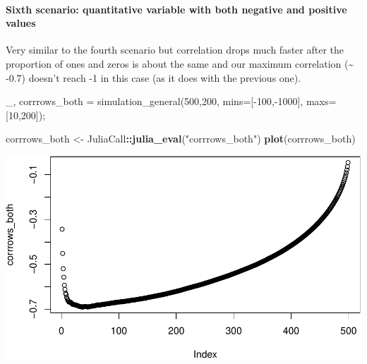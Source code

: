 \documentclass[]{article}
\newenvironment{Shaded}{\begin{snugshade}}{\end{snugshade}}
\newcommand{\FloatTok}[1]{\textcolor[rgb]{0.00,0.00,0.81}{#1}}
\newcommand{\KeywordTok}[1]{\textcolor[rgb]{0.13,0.29,0.53}{\textbf{#1}}}
\newcommand{\NormalTok}[1]{#1}
\newcommand{\OperatorTok}[1]{\textcolor[rgb]{0.81,0.36,0.00}{\textbf{#1}}}
\newcommand{\StringTok}[1]{\textcolor[rgb]{0.31,0.60,0.02}{#1}}
\let\oldparagraph\paragraph
\renewcommand{\paragraph}[1]{\oldparagraph{#1}\mbox{}}
\begin{document}
\newpage

\hypertarget{sixth-scenario-quantitative-variable-with-both-negative-and-positive-values}{%
\paragraph{Sixth scenario: quantitative variable with both negative and
positive
values}\label{sixth-scenario-quantitative-variable-with-both-negative-and-positive-values}}

Very similar to the fourth scenario but correlation drops much faster
after the proportion of ones and zeros is about the same and our maximum
correlation (\textasciitilde{} -0.7) doesn't reach -1 in this case (as
it does with the previous one).

\begin{Shaded}
\begin{Highlighting}[]
\NormalTok{_, corrrows_both = simulation_general(}\FloatTok{500}\NormalTok{,}\FloatTok{200}\NormalTok{, mins=[-}\FloatTok{100}\NormalTok{,-}\FloatTok{1000}\NormalTok{], maxs=[}\FloatTok{10}\NormalTok{,}\FloatTok{200}\NormalTok{]);}
\end{Highlighting}
\end{Shaded}

\begin{Shaded}
\begin{Highlighting}[]
\NormalTok{corrrows_both <-}\StringTok{ }\NormalTok{JuliaCall}\OperatorTok{::}\KeywordTok{julia_eval}\NormalTok{(}\StringTok{"corrrows_both"}\NormalTok{)}
\KeywordTok{plot}\NormalTok{(corrrows_both)}
\end{Highlighting}
\end{Shaded}

\includegraphics{./figures/unnamed-chunk-24-1.pdf}

\newpage
\end{document}
